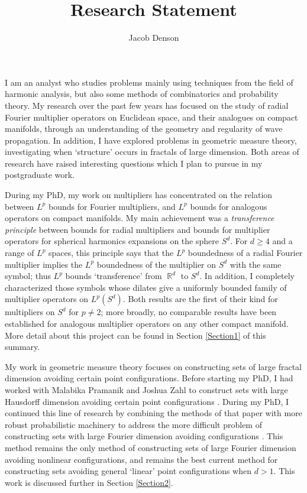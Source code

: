\documentclass[11pt]{article}
\title{\vspace{-2em}Research Statement}
\author{Jacob Denson}
\date{}
\DeclareMathOperator{\RR}{\mathbb{R}}
\begin{document}
\maketitle

\vspace{-1em}

I am an analyst who studies problems mainly using techniques from the field of harmonic analysis, but also some methods of combinatorics and probability theory. My research over the past few years has focused on the study of radial Fourier multiplier operators on Euclidean space, and their analogues on compact manifolds, through an understanding of the geometry and regularity of wave propagation. In addition, I have explored problems in geometric measure theory, investigating when `structure' occurs in fractals of large dimension. Both areas of research have raised interesting questions which I plan to pursue in my postgraduate work.

During my PhD, my work on multipliers has concentrated on the relation between $L^p$ bounds for Fourier multipliers, and $L^p$ bounds for analogous operators on compact manifolds. My main achievement was a \emph{transference principle} \cite{DensonCharacterization} between bounds for radial multipliers and bounds for multiplier operators for spherical harmonics expansions on the sphere $S^d$. For $d \geq 4$ and a range of $L^p$ spaces, this principle says that the $L^p$ boundedness of a radial Fourier multiplier implies the $L^p$ boundedness of the multiplier on $S^d$ with the same symbol; thus $L^p$ bounds `transference' from $\RR^d$ to $S^d$. In addition, I completely characterized those symbols whose dilates give a uniformly bounded family of multiplier operators on $L^p(S^d)$. Both results are the first of their kind for multipliers on $S^d$ for $p \neq 2$; more broadly, no comparable results have been established for analogous multiplier operators on any other compact manifold. More detail about this project can be found in Section \ref{Section1} of this summary.

My work in geometric measure theory focuses on constructing sets of large fractal dimension avoiding certain point configurations. Before starting my PhD, I had worked with Malabika Pramanik and Joshua Zahl to construct sets with large Hausdorff dimension avoiding certain point configurations \cite{DensonPramanikZahl}. During my PhD, I continued this line of research by combining the methods of that paper with more robust probabilistic machinery to address the more difficult problem of constructing sets with large Fourier dimension avoiding configurations \cite{DensonFourier}. This method remains the only method of constructing sets of large Fourier dimension avoiding nonlinear configurations, and remains the best current method for constructing sets avoiding general `linear' point configurations when $d > 1$. This work is discussed further in Section \ref{Section2}.
\end{document}
